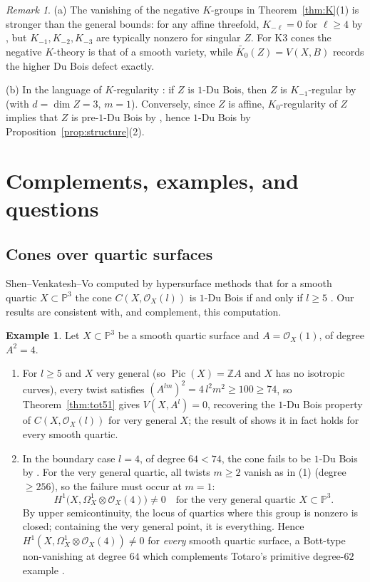 \documentclass[11pt]{amsart}
\numberwithin{equation}{section}
\theoremstyle{plain}
\theoremstyle{definition}
\newtheorem{example}[theorem]{Example}
\theoremstyle{remark}
\newtheorem{remark}[theorem]{Remark}
\newcommand{\ZZ}{\mathbb{Z}}
\newcommand{\PP}{\mathbb{P}}
\newcommand{\cO}{\mathcal{O}}
\newcommand{\Pic}{\operatorname{Pic}}
\newcommand{\Kzero}{K_0}
\begin{document}
\begin{remark}\label{rem:Kregularity}
(a) The vanishing of the negative $K$-groups in Theorem~\ref{thm:K}(1) is stronger than the general bounds: for any affine threefold, $K_{-\ell}=0$ for $\ell\ge4$ by \cite{CHSW}, but $K_{-1},K_{-2},K_{-3}$ are typically nonzero for singular $Z$.
For K3 cones the negative $K$-theory is that of a smooth variety, while $\widetilde{\Kzero}(Z)=V(X,B)$ records the higher Du Bois defect exactly.

(b) In the language of $K$-regularity \cite{Sh}: if $Z$ is $1$-Du Bois, then $Z$ is $K_{-1}$-regular by \cite[Prop.~A(1)]{Sh} (with $d=\dim Z=3$, $m=1$).
Conversely, since $Z$ is affine, $K_0$-regularity of $Z$ implies that $Z$ is pre-$1$-Du Bois by \cite[Prop.~A(2)]{Sh}, hence $1$-Du Bois by Proposition~\ref{prop:structure}(2).
\end{remark}

\section{Complements, examples, and questions}\label{sec:complements}

\subsection{Cones over quartic surfaces}
Shen--Venkatesh--Vo computed by hypersurface methods that for a smooth quartic $X\subset\PP^3$ the cone $C(X,\cO_X(l))$ is $1$-Du Bois if and only if $l\ge5$ \cite[Ex.~5.12(2)]{SVV}.
Our results are consistent with, and complement, this computation.

\begin{example}\label{ex:quartic}
Let $X\subset\PP^3$ be a smooth quartic surface and $A=\cO_X(1)$, of degree $A^2=4$.
\begin{enumerate}
\item For $l\ge5$ and $X$ very general (so $\Pic(X)=\ZZ A$ and $X$ has no isotropic curves), every twist satisfies $(A^{lm})^2=4\,l^2m^2\ge100\ge74$, so Theorem~\ref{thm:tot51} gives $V(X,A^l)=0$, recovering the $1$-Du Bois property of $C(X,\cO_X(l))$ for very general $X$; the result of \cite{SVV} shows it in fact holds for every smooth quartic.
\item In the boundary case $l=4$, of degree $64<74$, the cone fails to be $1$-Du Bois by \cite{SVV}.
For the very general quartic, all twists $m\ge2$ vanish as in (1) (degree $\ge256$), so the failure must occur at $m=1$:
\[
H^1\!\big(X,\Omega^1_X\otimes\cO_X(4)\big)\ne0 \quad\text{for the very general quartic } X\subset\PP^3 .
\]
By upper semicontinuity, the locus of quartics where this group is nonzero is closed; containing the very general point, it is everything.
Hence $H^1(X,\Omega^1_X\otimes\cO_X(4))\ne0$ for \emph{every} smooth quartic surface, a Bott-type non-vanishing at degree $64$ which complements Totaro's primitive degree-$62$ example \cite[Ex.~5.3]{Tot}.
\end{enumerate}
\end{example}
\end{document}
